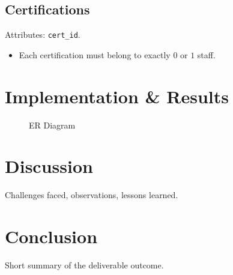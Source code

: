 \documentclass[a4paper,12pt]{article}
\begin{document}
\subsection*{Certifications}
Attributes: \texttt{cert\_id}.
\begin{itemize}
    \item Each certification must belong to exactly $0$ or $1$ staff.
\end{itemize}
\section{Implementation \& Results}
\begin{figure}[htbp]
    \caption{ER Diagram}
    \label{fig:ERD}
\end{figure}

\newpage


\section{Discussion}
Challenges faced, observations, lessons learned.

\section{Conclusion}
Short summary of the deliverable outcome.
\end{document}
